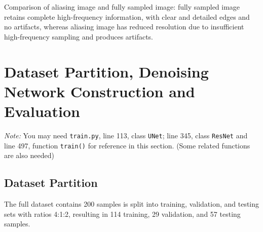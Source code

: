 \documentclass{article}
\begin{document}
Comparison of aliasing image and fully sampled image: fully sampled image retains
complete high-frequency information, with clear and detailed edges and no artifacts,
whereas aliasing image has reduced resolution due to insufficient high-frequency
sampling and produces artifacts.


\newpage
\section{Dataset Partition, Denoising Network Construction and Evaluation}
\textit{Note: }You may need \texttt{train.py}, line 113, class \texttt{UNet};
line 345, class \texttt{ResNet} and line 497, function \texttt{train()}
for reference in this section. (Some related functions are also needed)
\subsection{Dataset Partition}
The full dataset contains 200 samples is split into training, validation, and testing sets with ratios 4:1:2, resulting in 114 training, 29 validation,
and 57 testing samples.
\end{document}
